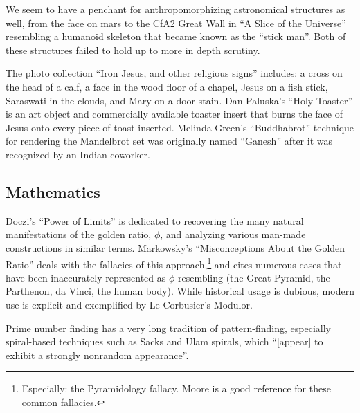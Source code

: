 \documentclass{thesis}
\begin{document}
	We seem to have a penchant for anthropomorphizing astronomical structures as well, from the face on mars\cite{brian_dunning_facemars_2008} to the CfA2 Great Wall in ``A Slice of the Universe''\cite{de_lapparent_slice_1986} resembling a humanoid skeleton that became known as the ``stick man''. Both of these structures failed to hold up to more in depth scrutiny.
	
	The photo collection ``Iron Jesus, and other religious signs''\cite{boston.com_religious_????} includes: a cross on the head of a calf, a face in the wood floor of a chapel, Jesus on a fish stick, Saraswati in the clouds, and Mary on a door stain. Dan Paluska's ``Holy Toaster''\cite{dan_paluska_holy_2005} is an art object and commercially available toaster insert that burns the face of Jesus onto every piece of toast inserted. Melinda Green's ``Buddhabrot''\cite{melinda_green_buddhabrot_1993} technique for rendering the Mandelbrot set was originally named ``Ganesh'' after it was recognized by an Indian coworker.
	
\subsection{Mathematics}
	Doczi's ``Power of Limits''\cite{Doczi81} is dedicated to recovering the many natural manifestations of the golden ratio, $\phi$, and analyzing various man-made constructions in similar terms. Markowsky's ``Misconceptions About the Golden Ratio''\cite{markowsky_misconceptions_1992} deals with the fallacies of this approach,\footnote{Especially: the Pyramidology fallacy. Moore\cite{Moore07} is a good reference for these common fallacies.} and cites numerous cases that have been inaccurately represented as $\phi$-resembling (the Great Pyramid, the Parthenon, da Vinci, the human body). While historical usage is dubious, modern use is explicit and exemplified by Le Corbusier's Modulor.\cite{padovan_proportion_1999}
	
	Prime number finding has a very long tradition of pattern-finding, especially spiral-based techniques such as Sacks\cite{michael_m._ross_natural_2007} and Ulam\cite{weisstein_prime_????} spirals, which ``[appear] to exhibit a strongly nonrandom appearance''.
\end{document}
